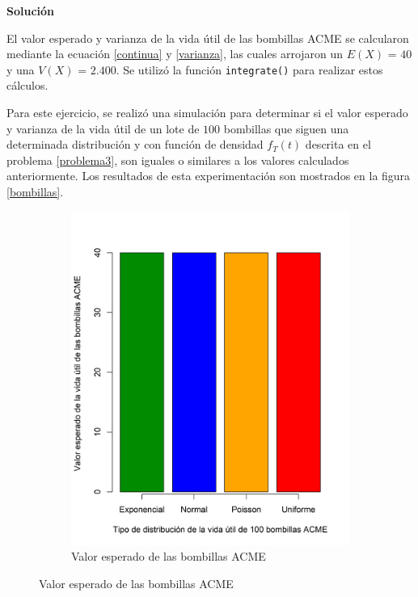 \documentclass{article}
\begin{document}
\noindent \textbf{Solución}

El valor esperado y varianza de la vida útil de las bombillas ACME se calcularon mediante la ecuación \ref{continua} y \ref{varianza}, las cuales arrojaron un $E{(X)}$ = $40$ y una $V{(X)}$ = $2.400$. Se utilizó la función \texttt{integrate()} para realizar estos cálculos.

Para este ejercicio, se realizó una simulación para determinar si el valor esperado y varianza de la vida útil de un lote de $100$ bombillas que siguen una determinada distribución y con función de densidad $f_{T}(t)$ descrita en el problema \ref{problema3}, son iguales o similares a los valores calculados anteriormente. Los resultados de esta experimentación son mostrados en la figura \ref{bombillas}. 

\begin{figure}[h]
    \begin{center}
    \captionsetup{justification=centering}
    \begin{subfigure}[b]{0.45\textwidth}
        \includegraphics[scale=0.5]{Figures/VEBombillas.png}
        \caption{Valor esperado de las bombillas ACME}

\end{subfigure}
\end{center}
\end{figure}
\end{document}

